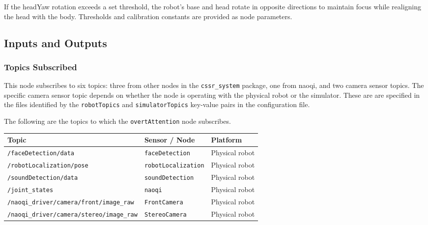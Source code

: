 \documentclass{CSSRforAfrica}
\begin{document}
If the headYaw rotation exceeds a set threshold, the robot's base and head rotate in opposite directions to maintain focus while realigning the head with the body. Thresholds and calibration constants are provided as node parameters.
 
\subsection{Inputs and Outputs}

\subsubsection*{Topics Subscribed}
This node  subscribes to six topics:  three from other nodes in the  {\small \verb+cssr_system+} package, one from naoqi,  and two camera sensor topics. The specific camera sensor topic depends on whether the node is operating with the physical robot or the simulator.  
These are are specified in the files identified by the {\small \verb+robotTopics+ }    and {\small \verb+simulatorTopics+ }   key-value pairs in the configuration file.

The following are the topics to which the {\small \verb+overtAttention+} node subscribes.

\begin{center}
	\begin{tabularx}{\linewidth}{| l | l | X|}
		\hline 
		{\small Topic }                               & {\small Sensor / Node}                            &  {\small Platform}       \\
		\hline
		{\footnotesize \verb+/faceDetection/data+ }  & {\footnotesize \verb+faceDetection+}    & {\small Physical robot} \\ 
		\hline
		{\footnotesize \verb+/robotLocalization/pose+ }  & {\footnotesize \verb+robotLocalization+}    & {\small Physical robot} \\ 
		\hline
		{\footnotesize \verb+/soundDetection/data+ }  & {\footnotesize \verb+soundDetection+}    & {\small Physical robot} \\ 
		\hline
		{\footnotesize \verb+/joint_states+ }  & {\footnotesize \verb+naoqi+}    & {\small Physical robot} \\ 
		\hline
		{\footnotesize \verb+/naoqi_driver/camera/front/image_raw+ }  & {\footnotesize \verb+FrontCamera+}    & {\small Physical robot } \\ 
		\hline
		{\footnotesize \verb+/naoqi_driver/camera/stereo/image_raw+ }  & {\footnotesize \verb+StereoCamera+}    & {\small Physical robot } \\ 
		\hline
	\end{tabularx}
\end{center}
\end{document}
